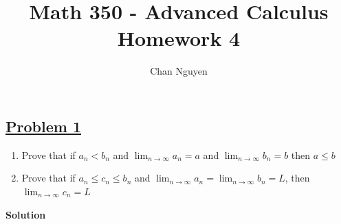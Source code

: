 \documentclass[10pt,letterpaper]{article}
\title{\textbf{Math 350 - Advanced Calculus \\ Homework 4}}
\author{Chan Nguyen}
\newcommand{\sol}{\textbf{Solution}}
\begin{document}
\tableofcontents 
\maketitle

\setlength{\parindent}{0pt}
\setlength{\parskip}{1ex}
	\subsection*{{\color{red}\underline{Problem 1}}}
	\begin{enumerate}[label=(\roman{*})]
		\item Prove that if $a_n < b_n$ and $\displaystyle\lim_{n\to \infty}a_n = a$ and $\displaystyle\lim_{n\to\infty}b_n = b$
		then $a \leq b$
		\item Prove that if $a_n \leq c_n \leq b_n$ and $\displaystyle\lim_{n\to \infty}a_n = \displaystyle\lim_{n\to \infty}b_n = L$, then
		$\displaystyle\lim_{n\to \infty}c_n = L$
	\end{enumerate}
	\sol
\end{document}
